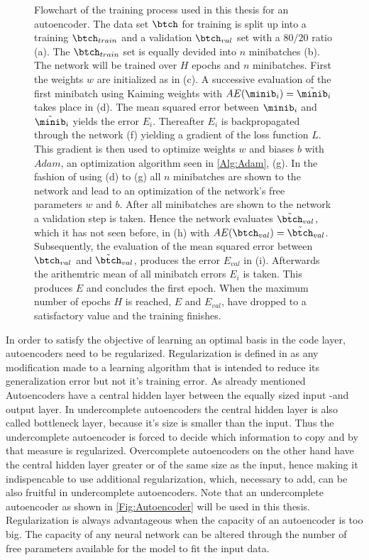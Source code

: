 \begin{figure}
	\centering
	
	\caption{\footnotesize Flowchart of the training process used in this thesis for an autoencoder. The data set \(\btch\) for training is split up into a training \(\btch_{train}\) and a validation \(\btch_{val}\) set with a \(80/20\) ratio (a). The \(\btch_{train}\) set is equally devided into \(n\) minibatches (b). The network will be trained over \(H\) epochs and \(n\) minibatches. First the weights \(w\) are initialized as in \cite{LeCun98} (c). A successive evaluation of the first minibatch using Kaiming weights with \(AE(\minib_{i})=\tilde{\minib}_{i}\) takes place in (d). The mean squared error between \(\minib_{i}\) and \(\tilde{\minib}_{i}\) yields the error \(E_{i}\). Thereafter \(E_{i}\) is backpropagated through the network (f) yielding a gradient of the loss function \(L\). This gradient is then used to optimize weights \(w\) and biases \(b\) with  \(Adam\), an optimization algorithm seen in \cref{Alg:Adam}, (g). In the fashion of using (d) to (g) all \(n\) minibatches are shown to the network and lead to an optimization of the network's free parameters \(w\) and \(b\). After all minibatches are shown to the network a validation step is taken. Hence the network evaluates \(\tilde{\btch}_{val}\), which it has not seen before, in (h) with \(AE(\btch_{val})=\tilde{\btch}_{val}\). Subsequently, the evaluation of the mean squared error between \(\btch_{val}\) and \(\tilde{\btch}_{val}\), produces the error \(E_{val}\) in (i). Afterwards the arithemtric mean of all minibatch errors \(E_{i}\) is taken. This produces \(E\) and concludes the first epoch. When the maximum number of epochs \(H\) is reached, \(E\) and \(E_{val}\), have dropped to a satisfactory value and the training finishes.}
	\label{Fig:Training}
\end{figure}
In order to satisfy the objective of learning an optimal basis in the code layer, autoencoders need to be regularized. Regularization is defined in \cite{Goodfellow} as any modification made to a learning algorithm that is intended to reduce its generalization error but not it's training error. As already mentioned Autoencoders have a central hidden layer between the equally sized input -and output layer. In undercomplete autoencoders the central hidden layer is also called bottleneck layer, because it's size is smaller than the input. Thus the undercomplete autoencoder is forced to decide which information to copy and by that measure is regularized. Overcomplete autoencoders on the other hand have the central hidden layer greater or of the same size as the input, hence making it indispencable to use additional regularization, which, necessary to add, can be also fruitful in undercomplete autoencoders. Note that an undercomplete autoencoder as shown in \cref{Fig:Autoencoder} will be used in this thesis. Regularization is always advantageous when the capacity of an autoencoder is too big. The capacity of any neural network can be altered through the number of free parameters available for the model to fit the input data.\\

